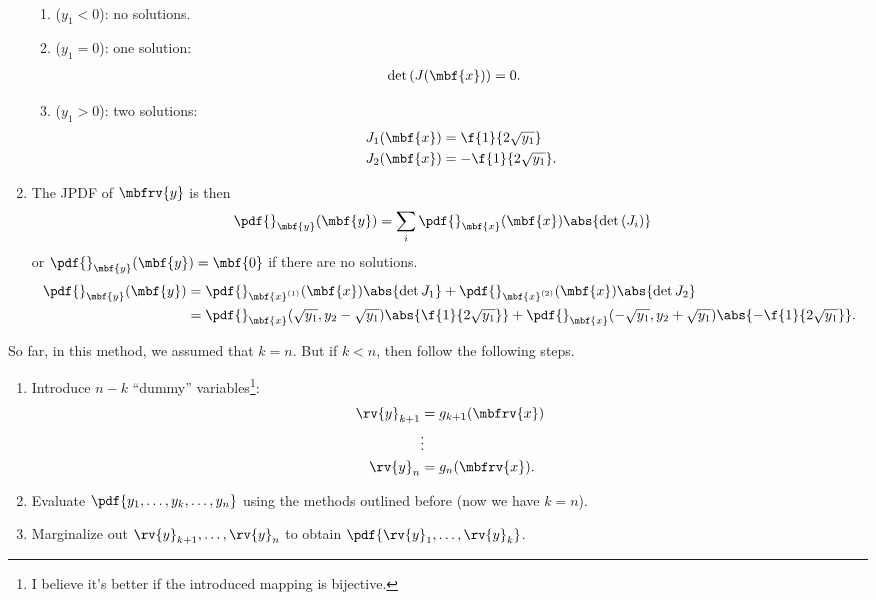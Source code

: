 \begin{example}
\begin{enumerate}
\begin{align}
        \end{align}
        \begin{enumerate}[label=Case~\Roman*]
            \item ($y_{1}<0$): no solutions.
            \item ($y_{1}=0$): one solution:
            \begin{align}
                \det\left(J(\mbf{x})\right) &= 0.
            \end{align}
            \item ($y_{1}>0$): two solutions:
            \begin{align}
                J_{1}(\mbf{x}) &= \f{1}{2\sqrt{y_{1}}}\\
                J_{2}(\mbf{x}) &= -\f{1}{2\sqrt{y_{1}}}.
            \end{align}
        \end{enumerate}
        \item The JPDF of $\mbfrv{y}$ is then 
        \begin{align}
            \pdf{}_{\mbf{y}}(\mbf{y}) &= 
            \sum_{i} \pdf{}_{\mbf{x}}(\mbf{x})\abs{\det\left(J_{i}\right)}
        \end{align}
        or $\pdf{}_{\mbf{y}}(\mbf{y})=\mbf{0}$ if there are no solutions.
        \begin{align}
            \pdf{}_{\mbf{y}}(\mbf{y}) &=
            \pdf{}_{\mbf{x}^{(1)}}(\mbf{x})\abs{\det J_{1}} +
            \pdf{}_{\mbf{x}^{(2)}}(\mbf{x})\abs{\det J_{2}}\\
            &= \pdf{}_{\mbf{x}}(\sqrt{y_{1}}, y_{2}-\sqrt{y_{1}})\abs{\f{1}{2\sqrt{y_{1}}}} + 
            \pdf{}_{\mbf{x}}(-\sqrt{y_{1}}, y_{2}+\sqrt{y_{1}})\abs{-\f{1}{2\sqrt{y_{1}}}}.
        \end{align}
    \end{enumerate}
    \triqed
\end{example}
\begin{myBlackBox}
    So far, in this method, we assumed that $k=n$. But if $k<n$, then follow the following steps.
    \begin{enumerate}
        \item Introduce $n-k$ ``dummy'' variables\footnote{I believe it's better if the introduced mapping is bijective.}:
        \begin{align}
            \rv{y}_{k+1} &= g_{k+1}(\mbfrv{x})\\
            &\vdots \\
            \rv{y}_{n} &= g_{n}(\mbfrv{x}).
        \end{align}
        \item Evaluate $\pdf{y_{1},\ldots,y_{k},\ldots,y_{n}}$ using the methods outlined before (now we have $k=n$).
        \item Marginalize out $\rv{y}_{k+1},\ldots,\rv{y}_{n}$ to obtain $\pdf{\rv{y}_{1},\ldots,\rv{y}_{k}}$.
    \end{enumerate}
\end{myBlackBox}
 
